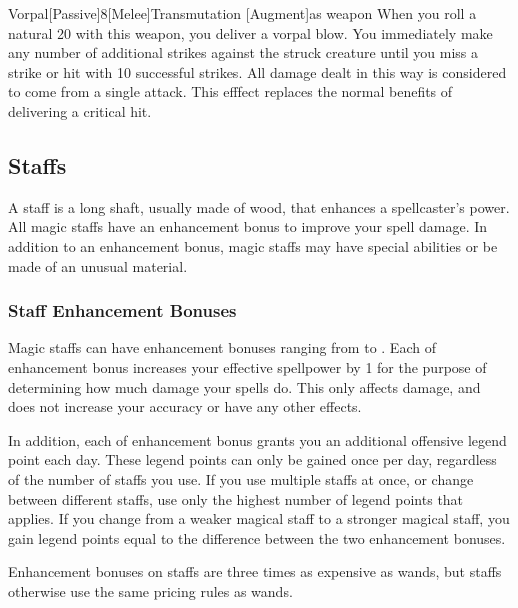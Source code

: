         \begin{magicitemdef}{Vorpal}[Passive]{8}[Melee]{Transmutation [Augment]}{as weapon}
             When you roll a natural 20 with this weapon, you deliver a vorpal blow.
            You immediately make any number of additional strikes against the struck creature until you miss a strike or hit with 10 successful strikes.
            All damage dealt in this way is considered to come from a single attack.
            This efffect replaces the normal benefits of delivering a critical hit.
        \end{magicitemdef}

    \subsection{Staffs}

        A staff is a long shaft, usually made of wood, that enhances a spellcaster's power.
        All magic staffs have an enhancement bonus to improve your spell damage.
        In addition to an enhancement bonus, magic staffs may have special abilities or be made of an unusual material.

        \subsubsection{Staff Enhancement Bonuses}\label{Staff Enhancement Bonuses}

            Magic staffs can have enhancement bonuses ranging from  to .
            Each  of enhancement bonus increases your effective spellpower by 1 for the purpose of determining how much damage your spells do.
            This only affects damage, and does not increase your accuracy or have any other effects.

            In addition, each  of enhancement bonus grants you an additional offensive legend point each day.
            These legend points can only be gained once per day, regardless of the number of staffs you use.
            If you use multiple staffs at once, or change between different staffs, use only the highest number of legend points that applies.
            If you change from a weaker magical staff to a stronger magical staff, you gain legend points equal to the difference between the two enhancement bonuses.


             Enhancement bonuses on staffs are three times as expensive as wands, but staffs otherwise use the same pricing rules as wands.

